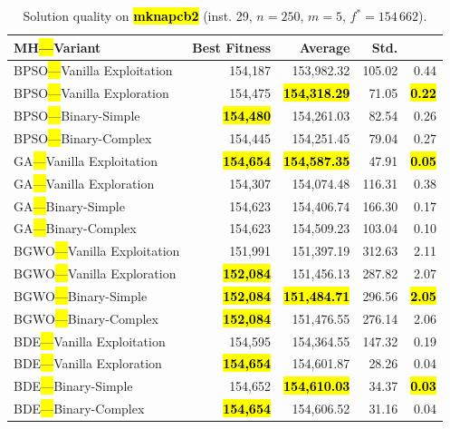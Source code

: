 \documentclass[mathematics,article,accept,moreauthors]{Definitions/mdpi}
\begin{document}
\vspace{-9pt}

\begin{table}[H]
  \small
  \caption{Solution quality on \textbf{\hl{mknapcb2}} (inst. 29, $n=250$, $m=5$, $f^*=154\,662$).}
  \label{tab:calidad_mknapcb2_29}
  \begin{tabularx}{\textwidth}{lRRRR}
    \toprule
    \textbf{MH\hl{---}Variant} &
    \textbf{Best Fitness} &
    \textbf{Average} &
    \textbf{Std.} &
    \textbf{} \\
    \midrule
    BPSO\hl{---}Vanilla Exploitation &         154,187 &        153,982.32 & 105.02 &         0.44 \\
    BPSO\hl{---}Vanilla Exploration  &         154,475 & \textbf{\hl{154,318.29}} &  71.05 & \textbf{\hl{0.22}} \\
    BPSO\hl{---}Binary-Simple        & \textbf{\hl{154,480}} &        154,261.03 &  82.54 &         0.26 \\
    BPSO\hl{---}Binary-Complex       &         154,445 &        154,251.45 &  79.04 &         0.27 \\
    \midrule
    GA\hl{---}Vanilla Exploitation   & \textbf{\hl{154,654}} & \textbf{\hl{154,587.35}} &  47.91 & \textbf{\hl{0.05}} \\
    GA\hl{---}Vanilla Exploration    &         154,307 &        154,074.48 & 116.31 &         0.38 \\
    GA\hl{---}Binary-Simple          &         154,623 &        154,406.74 & 166.30 &         0.17 \\
    GA\hl{---}Binary-Complex         &         154,623 &        154,509.23 & 103.04 &         0.10 \\
    \midrule
    BGWO\hl{---}Vanilla Exploitation &         151,991 &        151,397.19 & 312.63 &         2.11 \\
    BGWO\hl{---}Vanilla Exploration  & \textbf{\hl{152,084}} &        151,456.13 & 287.82 &         2.07 \\
    BGWO\hl{---}Binary-Simple        & \textbf{\hl{152,084}} & \textbf{\hl{151,484.71}} & 296.56 & \textbf{\hl{2.05}} \\
    BGWO\hl{---}Binary-Complex       & \textbf{\hl{152,084}} &        151,476.55 & 276.14 &         2.06 \\
    \midrule
    BDE\hl{---}Vanilla Exploitation  &         154,595 &        154,364.55 & 147.32 &         0.19 \\
    BDE\hl{---}Vanilla Exploration   & \textbf{\hl{154,654}} &        154,601.87 &  28.26 &         0.04 \\
    BDE\hl{---}Binary-Simple         &         154,652 & \textbf{\hl{154,610.03}} &  34.37 & \textbf{\hl{0.03}} \\
    BDE\hl{---}Binary-Complex        & \textbf{\hl{154,654}} &        154,606.52 &  31.16 &         0.04 \\
    \bottomrule
  \end{tabularx}
\end{table}
\end{document}
